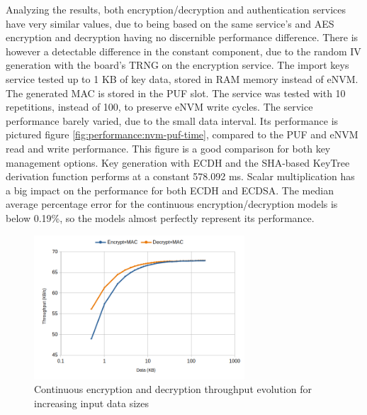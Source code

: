 Analyzing the results, both encryption/decryption and authentication services have very similar values, due to being based on the same service's and AES encryption and decryption having no discernible performance difference.
There is however a detectable difference in the constant component, due to the random IV generation with the board's TRNG on the encryption service.
The import keys service tested up to 1 KB of key data, stored in RAM memory instead of eNVM. The generated MAC is stored in the PUF slot. The service was tested with 10 repetitions, instead of 100, to preserve eNVM write cycles.
The service performance barely varied, due to the small data interval. Its performance is pictured figure \ref{fig:performance:nvm-puf-time}, compared to the PUF and eNVM read and write performance. This figure is a good comparison for both key management options.
Key generation with ECDH and the SHA-based KeyTree derivation function performs at a constant 578.092 ms.
Scalar multiplication has a big impact on the performance for both ECDH and ECDSA.
The median average percentage error for the continuous encryption/decryption models is below 0.19\%, so the models almost perfectly represent its performance.%

\begin{figure}[h!]
	\centering
	\includegraphics[width=0.7\textwidth]{./Images/services-tput.png}
	\caption{Continuous encryption and decryption throughput evolution for increasing input data sizes}
	\label{fig:performance:services-tput}
\end{figure}

